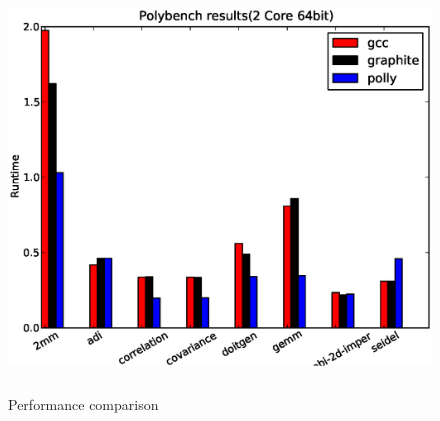 \begin{figure}
\begin{center}
  \label{fig:10core}
  \includegraphics[height=10cm]{images/2core64bit.eps}
  \caption{Performance comparison}
\end{center}
\end{figure}
